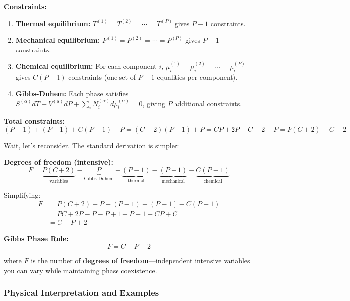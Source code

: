 \documentclass[9pt,twocoloumn]{article}
\begin{document}
\textbf{Constraints:}
\begin{enumerate}
    \item \textbf{Thermal equilibrium:} $T^{(1)} = T^{(2)} = \cdots = T^{(P)}$ gives $P-1$ constraints.
    \item \textbf{Mechanical equilibrium:} $P^{(1)} = P^{(2)} = \cdots = P^{(P)}$ gives $P-1$ constraints.
    \item \textbf{Chemical equilibrium:} For each component $i$, $\mu_i^{(1)} = \mu_i^{(2)} = \cdots = \mu_i^{(P)}$ gives $C(P-1)$ constraints (one set of $P-1$ equalities per component).
    \item \textbf{Gibbs-Duhem:} Each phase satisfies $S^{(\alpha)} dT - V^{(\alpha)} dP + \sum_i N_i^{(\alpha)} d\mu_i^{(\alpha)} = 0$, giving $P$ additional constraints.
\end{enumerate}

\textbf{Total constraints:}
\begin{equation}
(P-1) + (P-1) + C(P-1) + P = (C+2)(P-1) + P = CP + 2P - C - 2 + P = P(C+2) - C - 2
\end{equation}

Wait, let's reconsider. The standard derivation is simpler:

\textbf{Degrees of freedom (intensive):}
\begin{equation}
F = \underbrace{P(C+2)}_{\text{variables}} - \underbrace{P}_{\text{Gibbs-Duhem}} - \underbrace{(P-1)}_{\text{thermal}} - \underbrace{(P-1)}_{\text{mechanical}} - \underbrace{C(P-1)}_{\text{chemical}}
\end{equation}

Simplifying:
\begin{align}
F &= P(C+2) - P - (P-1) - (P-1) - C(P-1) \\
&= PC + 2P - P - P + 1 - P + 1 - CP + C \\
&= C - P + 2
\end{align}

\textbf{Gibbs Phase Rule:}
\begin{equation}
\boxed{F = C - P + 2}
\end{equation}

where $F$ is the number of \textbf{degrees of freedom}—independent intensive variables you can vary while maintaining phase coexistence.

\subsubsection{Physical Interpretation and Examples}
\end{document}

